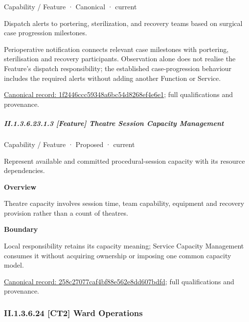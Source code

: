 \label{element:1f2446ccc59348a6bc54d8268ef4e6e1}
{\small Capability / Feature · Canonical · current}\par

Dispatch alerts to portering, sterilization, and recovery teams based on surgical case progression milestones.



Perioperative notification connects relevant case milestones with portering, sterilisation and recovery participants. Observation alone does not realise the Feature's dispatch responsibility; the established case-progression behaviour includes the required alerts without adding another Function or Service.


{\footnotesize \href{../../../../continuum/strategy/capability/feature/1f2446ccc59348a6bc54d8268ef4e6e1.md}{Canonical record: 1f2446ccc59348a6bc54d8268ef4e6e1}; full qualifications and provenance.}\par
\subparagraph*{II.1.3.6.23.1.3 [Feature] Theatre Session Capacity Management}
\label{navigation:II.1.3.6.23.1.3}

\label{element:258c27077caf4bf88e562e8dd607bdfd}
{\small Capability / Feature · Proposed · current}\par

Represent available and committed procedural-session capacity with its resource dependencies.



\textbf{Overview}



Theatre capacity involves session time, team capability, equipment and recovery provision rather than a count of theatres.



\textbf{Boundary}



Local responsibility retains its capacity meaning; Service Capacity Management consumes it without acquiring ownership or imposing one common capacity model.


{\footnotesize \href{../../../../continuum/strategy/capability/feature/258c27077caf4bf88e562e8dd607bdfd.md}{Canonical record: 258c27077caf4bf88e562e8dd607bdfd}; full qualifications and provenance.}\par
\subsubsection*{II.1.3.6.24 [CT2] Ward Operations}
\label{navigation:II.1.3.6.24}

